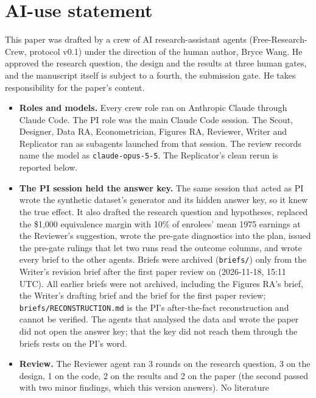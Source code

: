 \section*{AI-use statement}

This paper was drafted by a crew of AI research-assistant agents
(Free-Research-Crew, protocol v0.1) under the direction of the human author, Bryce Wang.
He approved the research question, the design and the results at three human gates, and
the manuscript itself is subject to a fourth, the submission gate. He takes responsibility
for the paper's content.

\begin{itemize}
  \item \textbf{Roles and models.} Every crew role ran on Anthropic Claude through Claude
        Code. The PI role was the main Claude Code session. The Scout, Designer, Data RA,
        Econometrician, Figures RA, Reviewer, Writer and Replicator ran as subagents
        launched from that session. The review records name the model as
        \texttt{claude-opus-5-5}. The Replicator's clean rerun is reported below.
  \item \textbf{The PI session held the answer key.} The same session that acted as PI
        wrote the synthetic dataset's generator and its hidden answer key, so it knew the
        true effect. It also drafted the research question and hypotheses, replaced the
        \$1,000 equivalence margin with 10\% of enrolees' mean 1975 earnings at the
        Reviewer's suggestion, wrote the pre-gate diagnostics into the plan, issued the
        pre-gate rulings that let two runs read the outcome columns, and wrote every brief
        to the other agents. Briefs were archived (\texttt{briefs/}) only from the
        Writer's revision brief after the first paper review on (2026-11-18, 15:11 UTC).
        All earlier briefs were not archived, including the Figures RA's brief, the
        Writer's drafting brief and the brief for the first paper review;
        \texttt{briefs/RECONSTRUCTION.md} is the PI's after-the-fact reconstruction and
        cannot be verified. The agents that analysed the data and wrote the paper did not
        open the answer key; that the key did not reach them through the briefs rests on
        the PI's word.
  \item \textbf{Review.} The Reviewer agent ran 3 rounds on the research question, 3 on the
        design, 1 on the code, 2 on the results and 2 on the paper (the second passed with two
        minor findings, which this version answers). No literature

\end{itemize}
